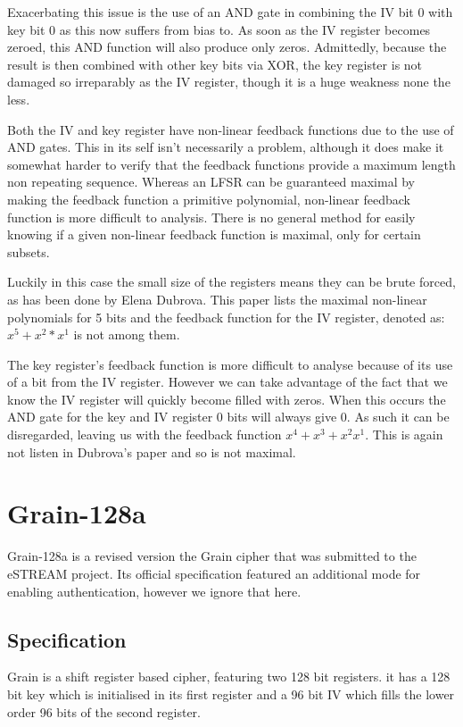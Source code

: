 \documentclass{report}
\let\Oldsection\section
\renewcommand{\section}{\FloatBarrier\Oldsection}
\let\Oldsubsection\subsection
\renewcommand{\subsection}{\FloatBarrier\Oldsubsection}
\begin{document}
Exacerbating this issue is the use of an AND gate in combining the IV bit 0 with key bit 0 as this now suffers from bias to. As soon as the IV register becomes zeroed, this AND function will also produce only zeros. Admittedly, because the result is then combined with other key bits via XOR, the key register is not damaged so irreparably as the IV register, though it is a huge weakness none the less.

Both the IV and key register have non-linear feedback functions due to the use of AND gates. This in its self isn't necessarily a problem, although it does make it somewhat harder to verify that the feedback functions provide a maximum length non repeating sequence. Whereas an LFSR can be guaranteed maximal by making the feedback function a primitive polynomial, non-linear feedback function is more difficult to analysis. There is no general method for easily knowing if a given non-linear feedback function is maximal, only for certain subsets\cite{nlfsrFeedback}.

Luckily in this case the small size of the registers means they can be brute forced, as has been done by Elena Dubrova\cite{nlfsrFeedback}. This paper lists the maximal non-linear polynomials for 5 bits and the feedback function for the IV register, denoted as: $x^5+x^2*x^1$ is not among them. 

The key register's feedback function is more difficult to analyse because of its use of a bit from the IV register. However we can take advantage of the fact that we know the IV register will quickly become filled with zeros. When this occurs the  AND gate for the key and IV register 0 bits will always give 0. As such it can be disregarded, leaving us with the feedback function $x^4+x^3+x^2x^1$. This is again not listen in Dubrova's paper and so is not maximal.

\section{Grain-128a}
Grain-128a is a revised version the Grain cipher that was submitted to the eSTREAM project\cite{Grain128aSpec}. Its official specification featured an additional mode for enabling authentication, however we ignore that here.
\begin{figure}[h]
\end{figure}
\subsection{Specification}
Grain is a shift register based cipher, featuring two 128 bit registers. it has a 128 bit key which is initialised in its first register and a 96 bit IV which fills the lower order 96 bits of the second register.
\end{document}
